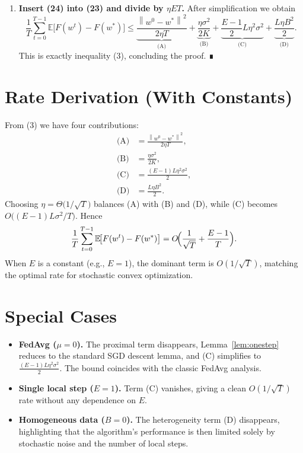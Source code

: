 \documentclass{article}
\newcommand{\E}{\mathbb{E}}
\newcommand{\norm}[1]{\left\lVert#1\right\rVert}
\begin{document}
\begin{enumerate}
\item[Step 12.] \textbf{Insert (24) into (23) and divide by $\eta E T$.}
After simplification we obtain
\[
\frac{1}{T}\sum_{t=0}^{T-1}\E\!\bigl[F(w^{t})-F(w^{*})\bigr]
\le
\underbrace{\frac{\norm{w^{0}-w^{*}}^{2}}{2\eta T}}_{\text{(A)}}
+\underbrace{\frac{\eta\sigma^{2}}{2K}}_{\text{(B)}}
+\underbrace{\frac{E-1}{2}L\eta^{2}\sigma^{2}}_{\text{(C)}}
+\underbrace{\frac{L\eta B^{2}}{2}}_{\text{(D)}}.
\]
This is exactly inequality (3), concluding the proof. ∎
\end{enumerate}

\section*{Rate Derivation (With Constants)}
From (3) we have four contributions:
\[
\begin{aligned}
\text{(A)} &= \frac{\norm{w^{0}-w^{*}}^{2}}{2\eta T},\\[2mm]
\text{(B)} &= \frac{\eta\sigma^{2}}{2K},\\[2mm]
\text{(C)} &= \frac{(E-1)L\eta^{2}\sigma^{2}}{2},\\[2mm]
\text{(D)} &= \frac{L\eta B^{2}}{2}.
\end{aligned}
\]
Choosing $\eta = \Theta\!\bigl(1/\sqrt{T}\bigr)$ balances (A) with (B) and (D), while (C) becomes $O\!\bigl((E-1)L\sigma^{2}/T\bigr)$.  Hence
\[
\frac{1}{T}\sum_{t=0}^{T-1}\E\!\bigl[F(w^{t})-F(w^{*})\bigr]
= O\!\Bigl(\frac{1}{\sqrt{T}} + \frac{E-1}{T}\Bigr).
\]
When $E$ is a constant (e.g., $E=1$), the dominant term is $O(1/\sqrt{T})$, matching the optimal rate for stochastic convex optimization.

\section*{Special Cases}
\begin{itemize}
    \item \textbf{FedAvg ($\mu=0$).}  The proximal term disappears, Lemma~\ref{lem:onestep} reduces to the standard SGD descent lemma, and (C) simplifies to $\frac{(E-1)L\eta^{2}\sigma^{2}}{2}$.  The bound coincides with the classic FedAvg analysis.
    \item \textbf{Single local step ($E=1$).}  Term (C) vanishes, giving a clean $O(1/\sqrt{T})$ rate without any dependence on $E$.
    \item \textbf{Homogeneous data ($B=0$).}  The heterogeneity term (D) disappears, highlighting that the algorithm’s performance is then limited solely by stochastic noise and the number of local steps.
\end{itemize}
\end{document}
